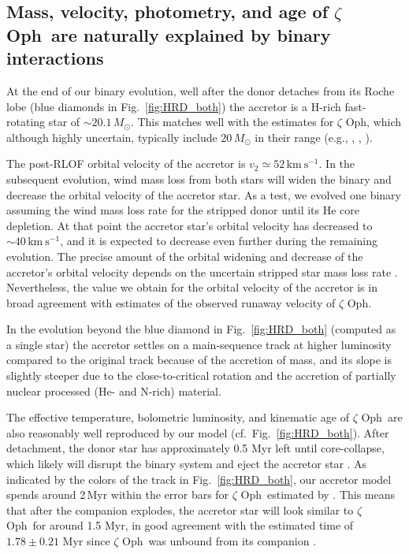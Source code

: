 \documentclass[twocolumn,twocolappendix,trackchanges]{aastex63}
\newcommand{\kms}{{\mathrm{km\ s^{-1}}}}
\DeclareRobustCommand{\Figref}[1]{Fig.~\ref{#1}}
\newcommand{\zoph}{$\zeta$ Oph}
\begin{document}
\subsection{Mass, velocity, photometry, and age of \zoph\ are naturally
  explained by binary interactions}

At the end of our binary evolution, well after the donor detaches from
its Roche lobe (blue diamonds in \Figref{fig:HRD_both}) the accretor
is a H-rich fast-rotating star of $\sim{}20.1\,M_\odot$. This matches
well with the estimates for \zoph, which although highly uncertain,
typically include $20\,M_\odot$ in their range (e.g.,
\citealt{hoogerwerf:01}, ,
\citealt{neuhauser:20}).

The post-RLOF orbital velocity of the
accretor is $v_2\simeq52\,\kms$. In the subsequent evolution, wind
mass loss from both stars will widen the binary and decrease the
orbital velocity of the accretor star.  As a test, we evolved one
binary assuming the \cite{nugis:00} wind mass loss rate for the
stripped donor until its He core depletion. At that point the
accretor star's orbital velocity has decreased to $\sim{}40\,\kms$,
and it is expected to decrease even further during the remaining
evolution.
The precise amount of the orbital widening and decrease of
the accretor's orbital velocity depends on the uncertain stripped
star mass loss rate \citep[e.g.,][]{vink:17, sander:20}. Nevertheless,
the value we obtain for the orbital velocity of the accretor is in broad agreement with estimates of the
observed runaway velocity of \zoph.

In the evolution beyond the blue diamond in \Figref{fig:HRD_both}
(computed as a single star) the accretor settles on a main-sequence
track at higher luminosity compared to the original track because of
the accretion of mass, and its slope is slightly steeper due to the
close-to-critical rotation and the accretion of partially nuclear
processed (He- and N-rich) material.

The effective temperature, bolometric luminosity, and kinematic age of
\zoph\ are also reasonably well reproduced by our model (cf.~\Figref{fig:HRD_both}). After
detachment, the donor star has approximately 0.5 Myr left until
core-collapse, which likely will disrupt the binary system and eject
the accretor star \citep[e.g.,][]{renzo:19walk}. As indicated by the colors
of the track in \Figref{fig:HRD_both}, our accretor model spends
around 2\,Myr within the error bars for \zoph\ estimated by
. This means that after the companion explodes,
the accretor star will look similar to \zoph\ for around 1.5 Myr, in
good agreement with the estimated time  of $1.78\pm0.21$ Myr since \zoph\ was unbound from its companion
\citep{neuhauser:20}.
\end{document}
